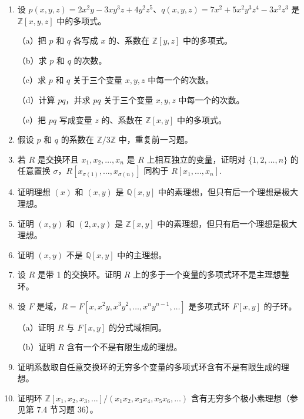\begin{enumerate}
\item 设 \(p(x, y, z) = 2x^2y - 3xy^3z + 4y^2z^5\)、\(q(x, y, z) = 7x^2 + 5x^2y^3z^4 - 3x^2z^3\) 是 \(\mathbb{Z}[x, y, z]\) 中的多项式。

（a）把 \(p\) 和 \(q\) 各写成 \(x\) 的、系数在 \(\mathbb{Z}[y, z]\) 中的多项式。

（b）求 \(p\) 和 \(q\) 的次数。

（c）求 \(p\) 和 \(q\) 关于三个变量 \(x, y, z\) 中每一个的次数。

（d）计算 \(pq\)，并求 \(pq\) 关于三个变量 \(x, y, z\) 中每一个的次数。

（e）把 \(pq\) 写成变量 \(z\) 的、系数在 \(\mathbb{Z}[x, y]\) 中的多项式。

\item 假设 \(p\) 和 \(q\) 的系数在 \(\mathbb{Z}/3\mathbb{Z}\) 中，重复前一习题。

\item 若 \(R\) 是交换环且 \(x_1, x_2, \ldots, x_n\) 是 \(R\) 上相互独立的变量，证明对 \(\{1, 2, \ldots, n\}\) 的任意置换 \(\sigma\)，\(R[x_{\sigma(1)}, \ldots, x_{\sigma(n)}]\) 同构于 \(R[x_1, \ldots, x_n]\).

\item 证明理想 \((x)\) 和 \((x, y)\) 是 \(\mathbb{Q}[x, y]\) 中的素理想，但只有后一个理想是极大理想。

\item 证明 \((x, y)\) 和 \((2, x, y)\) 是 \(\mathbb{Z}[x, y]\) 中的素理想，但只有后一个理想是极大理想。

\item 证明 \((x, y)\) 不是 \(\mathbb{Q}[x, y]\) 中的主理想。

\item 设 \(R\) 是带 1 的交换环。证明 \(R\) 上的多于一个变量的多项式环不是主理想整环。

\item 设 \(F\) 是域，\(R = F[x, x^2y, x^3y^2, \ldots, x^ny^{n-1}, \ldots]\) 是多项式环 \(F[x, y]\) 的子环。

（a）证明 \(R\) 与 \(F[x, y]\) 的分式域相同。

（b）证明 \(R\) 含有一个不是有限生成的理想。

\item 证明系数取自任意交换环的无穷多个变量的多项式环含有不是有限生成的理想。

\item 证明环 \(\mathbb{Z}[x_1, x_2, x_3, \ldots]/(x_1x_2, x_3x_4, x_5x_6, \ldots)\) 含有无穷多个极小素理想（参见第 7.4 节习题 36）。


\end{enumerate}
